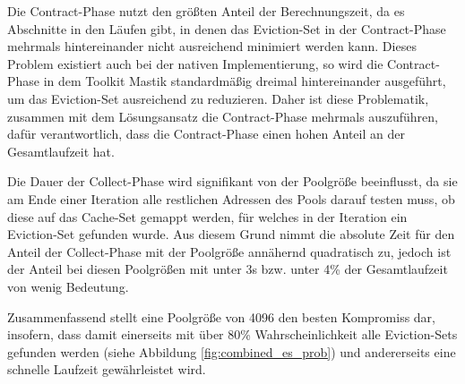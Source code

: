 Die Contract-Phase nutzt den größten Anteil der Berechnungszeit, da es Abschnitte in den Läufen gibt, in denen das Eviction-Set in der Contract-Phase mehrmals hintereinander nicht ausreichend minimiert werden kann.
Dieses Problem existiert auch bei der nativen Implementierung, so wird die Contract-Phase in dem Toolkit Mastik standardmäßig dreimal hintereinander ausgeführt, um das Eviction-Set ausreichend zu reduzieren.
Daher ist diese Problematik, zusammen mit dem Lösungsansatz die Contract-Phase mehrmals auszuführen, dafür verantwortlich, dass die Contract-Phase einen hohen Anteil an der Gesamtlaufzeit hat.

Die Dauer der Collect-Phase wird signifikant von der Poolgröße beeinflusst, da sie am Ende einer Iteration alle restlichen Adressen des Pools darauf testen muss, ob diese auf das Cache-Set gemappt werden, für welches in der Iteration ein Eviction-Set gefunden wurde.
Aus diesem Grund nimmt die absolute Zeit für den Anteil der Collect-Phase mit der Poolgröße annähernd quadratisch zu, jedoch ist der Anteil bei diesen Poolgrößen mit unter 3s bzw. unter 4\% der Gesamtlaufzeit von wenig Bedeutung.

Zusammenfassend stellt eine Poolgröße von 4096 den besten Kompromiss dar, insofern, dass damit einerseits mit über 80\% Wahrscheinlichkeit alle Eviction-Sets gefunden werden (siehe Abbildung \ref{fig:combined_es_prob}) und andererseits eine schnelle Laufzeit gewährleistet wird.





